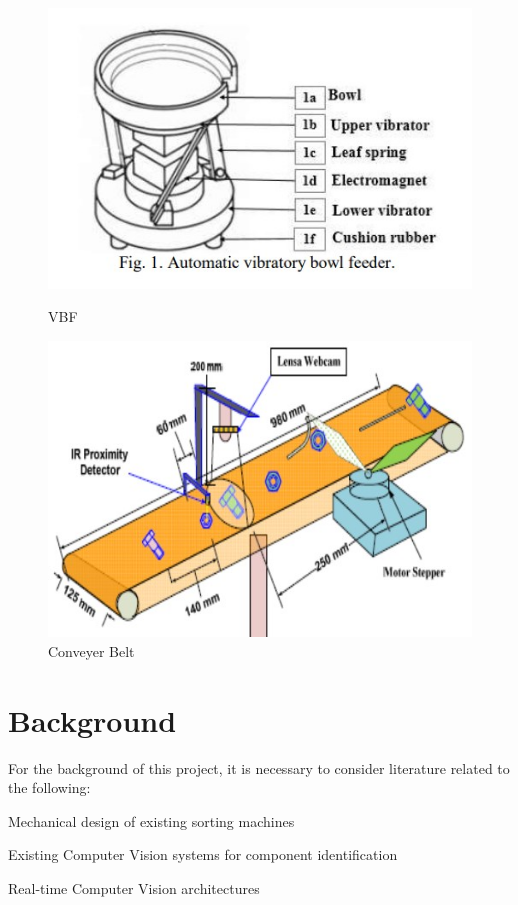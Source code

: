 \begin{figure}
    \begin{minipage}[t]{0.45\textwidth}
      \centering
      \includegraphics[width=\textwidth]{imgs/articles/feeder.jpg}
      \caption{VBF \citet{nam2019design}}
      \label{fig:feeder}
    \end{minipage}
    \hfill
    \begin{minipage}[t]{0.45\textwidth}
        \centering
        \includegraphics[width=\textwidth]{imgs/articles/conveyer.jpg}
        \caption{Conveyer Belt \citet{Dhenge2013MechanicalNS}}
        \label{fig:conveyer}
        \end{minipage}
\end{figure}

\section{Background}
For the background of this project, it is necessary to consider literature related to the following:
\begin{mylist}
  \item Mechanical design of existing sorting machines
  \item Existing Computer Vision systems for component identification
  \item Real-time Computer Vision architectures
\end{mylist}
